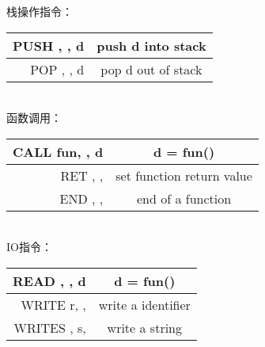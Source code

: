 栈操作指令：\\
\begin{tabular}{r|c}
	\hline
	PUSH  , , d & push d into stack\\ \hline
	POP  , , d & pop d out of stack\\ \hline
\end{tabular}\\
函数调用：\\
\begin{tabular}{r|c}
	\hline
	CALL  fun, , d & d = fun()\\ \hline
	RET  , , & set function return value\\ \hline
	END  , , & end of a function\\ \hline
\end{tabular}\\
IO指令：\\
\begin{tabular}{r|c}
	\hline
	READ  , , d & d = fun()\\ \hline
	WRITE  r, , & write a identifier\\ \hline
	WRITES  , s, & write a string\\ \hline
\end{tabular}
